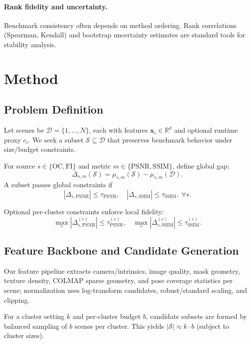\documentclass[10pt,twocolumn,letterpaper]{article}
\newcommand{\bbR}{\mathbb{R}}
\begin{document}
\paragraph{Rank fidelity and uncertainty.}
Benchmark consistency often depends on method ordering. Rank correlations (Spearman, Kendall) and bootstrap uncertainty estimates are standard tools for stability analysis.

\section{Method}
\subsection{Problem Definition}
Let scenes be \(\mathcal{D}=\{1,\ldots,N\}\), each with features \(\mathbf{x}_i\in\bbR^d\) and optional runtime proxy \(c_i\). We seek a subset \(\mathcal{S}\subseteq\mathcal{D}\) that preserves benchmark behavior under size/budget constraints.

For source \(s\in\{\text{OC},\text{FI}\}\) and metric \(m\in\{\text{PSNR},\text{SSIM}\}\), define global gap:
\begin{equation}
\Delta_{s,m}(\mathcal{S}) = \mu_{s,m}(\mathcal{S}) - \mu_{s,m}(\mathcal{D}).
\end{equation}
A subset passes global constraints if
\begin{equation}
|\Delta_{s,\text{PSNR}}|\le\tau_{\text{PSNR}},\quad
|\Delta_{s,\text{SSIM}}|\le\tau_{\text{SSIM}},\;\forall s.
\end{equation}

Optional per-cluster constraints enforce local fidelity:
\begin{equation}
\max_c |\Delta^{(c)}_{s,\text{PSNR}}|\le\tau^{(c)}_{\text{PSNR}},\quad
\max_c |\Delta^{(c)}_{s,\text{SSIM}}|\le\tau^{(c)}_{\text{SSIM}}.
\end{equation}

\subsection{Feature Backbone and Candidate Generation}
Our feature pipeline extracts camera/intrinsics, image quality, mask geometry, texture density, COLMAP sparse geometry, and pose coverage statistics per scene; normalization uses log-transform candidates, robust/standard scaling, and clipping.

For a cluster setting \(k\) and per-cluster budget \(b\), candidate subsets are formed by balanced sampling of \(b\) scenes per cluster. This yields \(|\mathcal{S}|\approx k\cdot b\) (subject to cluster sizes).
\end{document}
